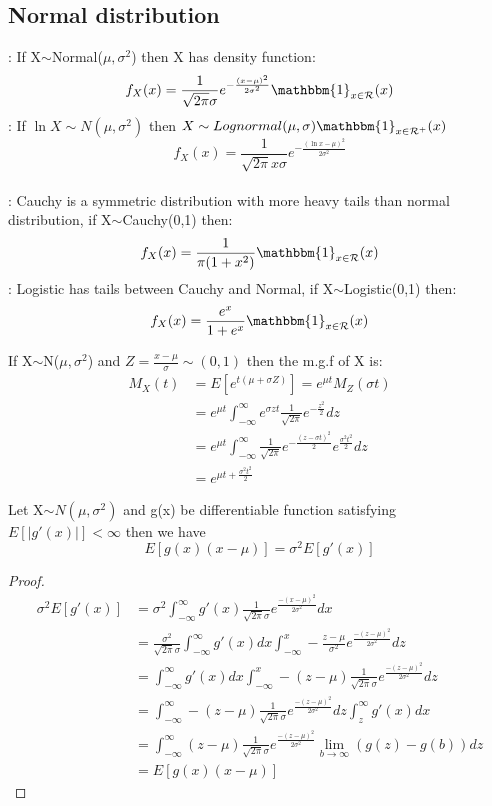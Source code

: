 \documentclass[../Distributions.tex]{subfiles}
\begin{document}
\subsection{Normal distribution}
: If X$\sim$Normal($\mu,\sigma^2$) then X has density function: $$f_X(x)=\frac{1}{\sqrt{2\pi}\sigma}e^{-\frac{(x-\mu)^2}{2\sigma^2}}\mathbbm{1}_{x\in\mathcal{R}}(x)$$
: If $\ln X\sim N(\mu,\sigma^2)$ then $X\sim Lognormal(\mu,\sigma)\mathbbm{1}_{x\in\mathcal{R}^+}(x)$
$$f_X(x)=\frac{1}{\sqrt{2\pi}x\sigma}e^{-\frac{(\ln x-\mu)^2}{2\sigma^2}}$$\\
: Cauchy is a symmetric distribution with more heavy tails than normal distribution, if X$\sim$Cauchy(0,1) then:
$$f_X(x)=\frac{1}{\pi(1+x^2)}\mathbbm{1}_{x\in\mathcal{R}}(x)$$
: Logistic has tails between Cauchy and Normal, if X$\sim$Logistic(0,1) then:
$$f_X(x)=\frac{e^x}{1+e^x}\mathbbm{1}_{x\in\mathcal{R}}(x)$$
\begin{property} If X$\sim$N($\mu,\sigma^2$) and $Z=\frac{x-\mu}{\sigma}\sim(0,1)$ then the m.g.f of X is:
\begin{align*}
M_X(t)&=E[e^{t(\mu+\sigma Z)}]=e^{\mu t}M_Z(\sigma t)\\
&=e^{\mu t}\int_{-\infty}^{\infty}e^{\sigma zt}\frac{1}{\sqrt{2\pi}}e^{-\frac{z^2}{2}}dz\\
&=e^{\mu t}\int_{-\infty}^{\infty}\frac{1}{\sqrt{2\pi}}e^{-\frac{(z-\sigma t)^2}{2}}e^{\frac{\sigma^2t^2}{2}}dz\\
&=e^{\mu t+\frac{\sigma^2t^2}{2}}
\end{align*}
\begin{theorem}Let X$\sim N(\mu,\sigma^2)$ and g(x) be differentiable function satisfying $E[|g'(x)|]<\infty$ then we have  $$E[g(x)(x-\mu)]=\sigma^2E[g'(x)]$$
\begin{proof}
\begin{align*}
\sigma^2E[g'(x)]&=\sigma^2\int_{-\infty}^{\infty}g'(x)\frac{1}{\sqrt{2\pi}\sigma}e^{\frac{-(x-\mu)^2}{2\sigma^2}}dx\\
&=\frac{\sigma^2}{\sqrt{2\pi}\sigma}\int_{-\infty}^{\infty}g'(x)dx\int_{-\infty}^{x}-\frac{z-\mu}{\sigma^2}e^{\frac{-(z-\mu)^2}{2\sigma^2}}dz\\
&=\int_{-\infty}^{\infty}g'(x)dx\int_{-\infty}^{x}-(z-\mu)\frac{1}{\sqrt{2\pi}\sigma}e^{\frac{-(z-\mu)^2}{2\sigma^2}}dz\\
&=\int_{-\infty}^{\infty}-(z-\mu)\frac{1}{\sqrt{2\pi}\sigma}e^{\frac{-(z-\mu)^2}{2\sigma^2}}dz\int_{z}^{\infty}g'(x)dx\\
&=\int_{-\infty}^{\infty}(z-\mu)\frac{1}{\sqrt{2\pi}\sigma}e^{\frac{-(z-\mu)^2}{2\sigma^2}}\lim_{b\rightarrow\infty}(g(z)-g(b))dz\\
&=E[g(x)(x-\mu)]
\end{align*}
\end{proof}
\end{theorem}
\end{property}
\end{document}

